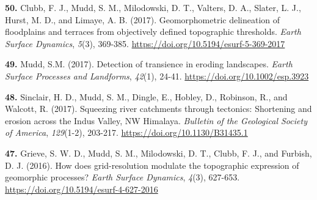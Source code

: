 \documentclass[10pt, a4paper]{article}
\newcommand{\years}[1]{\marginnote{\scriptsize #1}}
\begin{document}
\years{2017}\hangindent=0.7cm\textbf{50. }Clubb, F. J., Mudd, S. M., Milodowski, D. T., Valters, D. A., Slater, L. J., Hurst, M. D., and Limaye, A. B. (2017). Geomorphometric delineation of floodplains and terraces from objectively defined topographic thresholds. \textit{Earth Surface Dynamics}, \textit{5}(3), 369-385. \href{https://doi.org/10.5194/esurf-5-369-2017}{https://doi.org/10.5194/esurf-5-369-2017}\par
\years{2017}\hangindent=0.7cm\textbf{49. }Mudd, S.M. (2017). Detection of transience in eroding landscapes. \textit{Earth Surface Processes and Landforms}, \textit{42}(1), 24-41. \href{https://doi.org/10.1002/esp.3923}{https://doi.org/10.1002/esp.3923}\par
\years{2017}\hangindent=0.7cm\textbf{48. }Sinclair, H. D., Mudd, S. M., Dingle, E., Hobley, D., Robinson, R., and Walcott, R. (2017). Squeezing river catchments through tectonics: Shortening and erosion across the Indus Valley, NW Himalaya. \textit{Bulletin of the Geological Society of America}, \textit{129}(1-2), 203-217. \href{https://doi.org/10.1130/B31435.1}{https://doi.org/10.1130/B31435.1}\par
\years{2016}\hangindent=0.7cm\textbf{47. }Grieve, S. W. D., Mudd, S. M., Milodowski, D. T., Clubb, F. J., and Furbish, D. J. (2016). How does grid-resolution modulate the topographic expression of geomorphic processes? \textit{Earth Surface Dynamics}, \textit{4}(3), 627-653. \href{https://doi.org/10.5194/esurf-4-627-2016}{https://doi.org/10.5194/esurf-4-627-2016}\par
\end{document}
